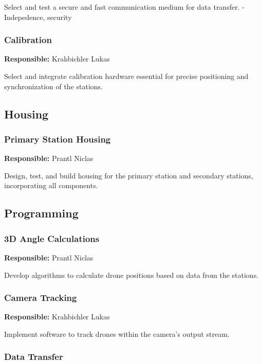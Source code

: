 Select and test a secure and fast communication medium for data transfer. - Indepedence, security

\subsubsection{Calibration}

\textbf{Responsible:} Krahbichler Lukas

Select and integrate calibration hardware essential for precise positioning and synchronization of the stations.

\subsection{Housing}

\subsubsection{Primary Station Housing}

\textbf{Responsible:} Prantl Niclas

Design, test, and build housing for the primary station and secondary stations, incorporating all components.

\subsection{Programming}

\subsubsection{3D Angle Calculations}

\textbf{Responsible:} Prantl Niclas

Develop algorithms to calculate drone positions based on data from the stations.

\subsubsection{Camera Tracking}

\textbf{Responsible:} Krahbichler Lukas

Implement software to track drones within the camera's output stream.

\subsubsection{Data Transfer}

